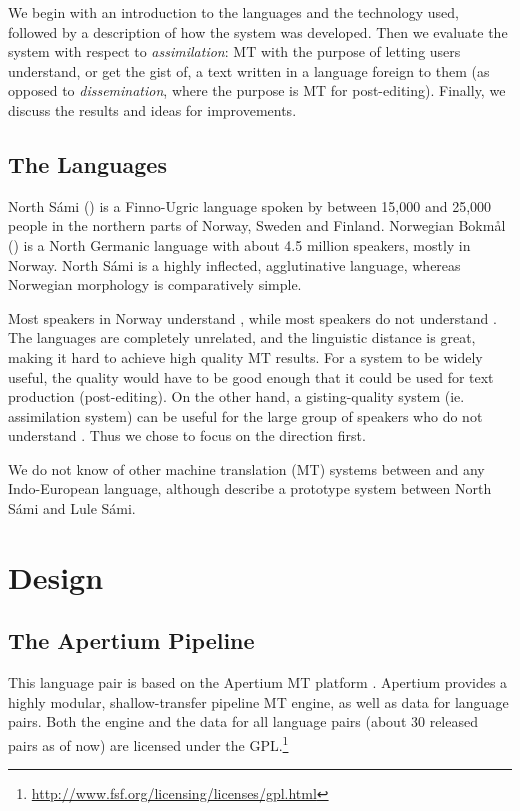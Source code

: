 \documentclass{book}
\begin{document}
We begin with an introduction to the languages and the technology
used, followed by a description of how the system was developed. Then
we evaluate the system with respect to \textit{assimilation}: MT with
the purpose of letting users understand, or get the gist of, a text
written in a language foreign to them (as opposed to
\textit{dissemination}, where the purpose is MT for post-editing).
Finally, we discuss the results and ideas for improvements.


\subsection{The Languages}
North S\'{a}mi (\sme{}) is a Finno-Ugric language spoken by between 
15,000 and 25,000 people in the northern parts of Norway, Sweden and
Finland. Norwegian Bokm{\aa}l (\nob{}) is a North Germanic language
with about 4.5 million speakers, mostly in Norway. North S\'{a}mi %
is a highly inflected, agglutinative language, whereas Norwegian
morphology is comparatively simple.

Most \sme{} speakers in Norway understand \nob{}, while most \nob{}
speakers do not understand \sme{}. The languages are completely
unrelated, and the linguistic distance is great, making it hard to
achieve high quality MT results. For a \nobsme{} system to be widely
useful, the quality would have to be good enough that it could be used
for text production (post-editing). On the other hand, a \smenob{}
gisting-quality system (ie. assimilation system) can be useful for the
large group of \nob{} speakers who do not understand \sme{}. Thus we
chose to focus on the \smenob{} direction first.

We do not know of other machine translation (MT) systems between \sme{}
and any Indo-European language, although \citet{tyers2009dpm} describe %
a prototype system between North S\'{a}mi and Lule S\'{a}mi.



\section{Design}
 \label{sec:design}

\subsection{The Apertium Pipeline}
This language pair is based on the Apertium MT
platform \citep{forcada2011afp,zubizarreta2009amt}. Apertium provides a
highly modular, shallow-transfer pipeline MT engine, as well as data
for language pairs. Both the engine and the data for all language
pairs (about 30 released pairs as of now) are licensed under the
GPL.\footnote{\href{http://www.fsf.org/licensing/licenses/gpl.html}{http://www.fsf.org/licensing/licenses/gpl.html}}
\end{document}
